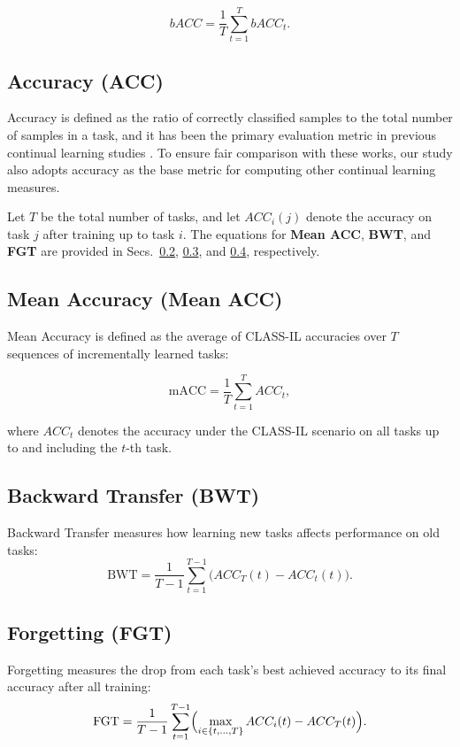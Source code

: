 \documentclass[10pt,twocolumn,letterpaper]{article}
\begin{document}
\begin{equation}
{bACC = \frac{1}{T}\sum_{t=1}^{T} bACC_t.}
\end{equation}


\subsection{Accuracy (ACC)}

Accuracy is defined as the ratio of correctly classified samples to the total number of samples in a task, and it has been the primary evaluation metric in previous continual learning studies \cite{agem,erace,derpp,huang2023conslide,adafgrad}. To ensure fair comparison with these works, our study also adopts accuracy as the base metric for computing other continual learning measures.

Let $T$ be the total number of tasks, and let $ACC_i(j)$ denote the accuracy on task $j$ after training up to task $i$. The equations for \textbf{Mean ACC}, \textbf{BWT}, and \textbf{FGT} are provided in Secs.~\ref{sec:meanacc}, \ref{sec:bwt}, and \ref{sec:fgt}, respectively.

\subsection{Mean Accuracy (Mean ACC)}\label{sec:meanacc}
Mean Accuracy is defined as the average of CLASS-IL accuracies over $T$ sequences of incrementally learned tasks:

\begin{equation}
\mathrm{mACC} = \frac{1}{T} \sum_{t=1}^{T} ACC_{t},
\label{eq:mean_acc}
\end{equation}

\noindent where $ACC_{t}$ denotes the accuracy under the CLASS-IL scenario on all tasks up to and including the $t$-th task.

\subsection{Backward Transfer (BWT)}\label{sec:bwt}
Backward Transfer measures how learning new tasks affects performance on old tasks:
\begin{equation}
\mathrm{BWT}
=\frac{1}{T-1}
\sum_{t=1}^{T-1}\bigl(ACC_{T}(t)-ACC_{t}(t)\bigr).
\end{equation}

\subsection{Forgetting (FGT)}\label{sec:fgt}
Forgetting measures the drop from each task’s best achieved accuracy to its final accuracy after all training:
\begin{equation}
\mathrm{FGT}
=\frac{1}{T-1}\sum_{t=1}^{T-1}
\Bigl(\max_{i\in\{t,\dots,T\}}ACC_{i}(t)-ACC_{T}(t)\Bigr).
\end{equation}
\end{document}
